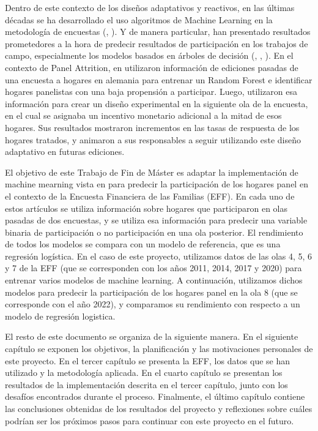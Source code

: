 Dentro de este contexto de los diseños adaptativos y reactivos, en las últimas décadas se ha desarrollado el uso algoritmos de Machine Learning en la metodología de encuestas (\cite{buskirk2018introduction}, \cite{kern2019tree}). Y de manera particular, han presentado resultados prometedores a la hora de predecir resultados de participación en los trabajos de campo, especialmente los modelos basados en árboles de decisión (\cite{kern2019tree}, \cite{kern2021predicting}, \cite{liu2020using}). En el contexto de Panel Attrition, en \cite{beste2023case} utilizaron información de ediciones pasadas de una encuesta a hogares en alemania para entrenar un Random Forest e identificar hogares panelistas con una baja propensión a participar. Luego, utilizaron esa información para crear un diseño experimental en la siguiente ola de la encuesta, en el cual se asignaba un incentivo monetario adicional a la mitad de esos hogares. Sus resultados mostraron incrementos en las tasas de respuesta de los hogares tratados, y animaron a sus responsables a seguir utilizando este diseño adaptativo en futuras ediciones.

El objetivo de este Trabajo de Fin de Máster es adaptar la implementación de machine mearning vista en \cite{beste2023case} para predecir la participación de los hogares panel en el contexto de la Encuesta Financiera de las Familias (EFF). En cada uno de estos artículos se utiliza información sobre hogares que participaron en olas pasadas de dos encuestas, y se utiliza esa información para predecir una variable binaria de participación o no participación en una ola posterior. El rendimiento de todos los modelos se compara con un modelo de referencia, que es una regresión logística. En el caso de este proyecto, utilizamos datos de las olas 4, 5, 6 y 7 de la EFF (que se corresponden con los años 2011, 2014, 2017 y 2020) para entrenar varios modelos de machine learning. A continuación, utilizamos dichos modelos para predecir la participación de los hogares panel en la ola 8 (que se corresponde con el año 2022), y comparamos su rendimiento con respecto a un modelo de regresión logistica.

El resto de este documento se organiza de la siguiente manera. En el siguiente capítulo se exponen los objetivos, la planificación y las motivaciones personales de este proyecto. En el tercer capítulo se presenta la EFF, los datos que se han utilizado y la metodología aplicada. En el cuarto capítulo se presentan los resultados de la implementación descrita en el tercer capítulo, junto con los desafíos encontrados durante el proceso. Finalmente, el último capítulo contiene las conclusiones obtenidas de los resultados del proyecto y reflexiones sobre cuáles podrían ser los próximos pasos para continuar con este proyecto en el futuro.
